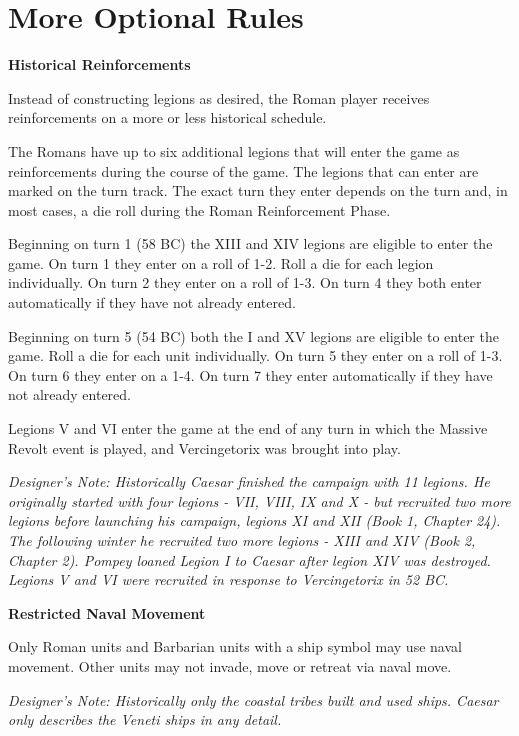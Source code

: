 \pagebreak[4]
\section{More Optional Rules}
\par

\textbf{Historical Reinforcements}

Instead of constructing legions as desired, the Roman player receives reinforcements on a more or less historical schedule.

The Romans have up to six additional legions that will enter the game as reinforcements during the course of the game. The legions that can enter are marked on the turn track. The exact turn they enter depends on the turn and, in most cases, a die roll during the Roman Reinforcement Phase.

Beginning on turn 1 (58 BC) the XIII and XIV legions are eligible to enter the game. On turn 1 they enter on a roll of 1-2. Roll a die for each legion individually. On turn 2 they enter on a roll of 1-3. On turn 4 they both enter automatically if they have not already entered.

Beginning on turn 5 (54 BC) both the I and XV legions are eligible to enter the game. Roll a die for each unit individually. On turn 5 they enter on a roll of 1-3. On turn 6 they enter on a 1-4. On turn 7 they enter automatically if they have not already entered.

Legions V and VI enter the game at the end of any turn in which the Massive Revolt event is played, and Vercingetorix was brought into play.

\textit{Designer's Note: Historically Caesar finished the campaign with 11 legions. He originally started with four legions - VII, VIII, IX and X - but recruited two more legions before launching his campaign, legions XI and XII (Book 1, Chapter 24). The following winter he recruited two more legions - XIII and XIV (Book 2, Chapter 2). Pompey loaned Legion I to Caesar after legion XIV was destroyed. Legions V and VI were recruited in response to Vercingetorix in 52 BC.}

\textbf{Restricted Naval Movement}

Only Roman units and Barbarian units with a ship symbol may use naval movement. Other units may not invade, move or retreat via naval move.

\textit{Designer's Note: Historically only the coastal tribes built and used ships. Caesar only describes the Veneti ships in any detail.}